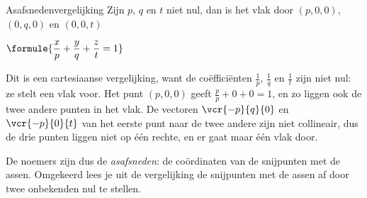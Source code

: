 \begin{theorie}
\begin{stelling}{Asafsnedenvergelijking}
Zijn $p$, $q$ en $t$ niet nul, dan is het vlak door $(p, 0, 0)$, $(0, q, 0)$ en $(0, 0, t)$

\vspace{1mm}
\qquad $\formule{\dfrac{x}{p} + \dfrac{y}{q} + \dfrac{z}{t} = 1}$
\end{stelling}
\begin{bewijs}
Dit is een cartesiaanse vergelijking, want de coëfficiënten $\frac1p$, $\frac1q$ en $\frac1t$ zijn niet nul: ze stelt een vlak voor. Het punt $(p, 0, 0)$ geeft $\frac{p}{p} + 0 + 0 = 1$, en zo liggen ook de twee andere punten in het vlak. De vectoren $\vcr{-p}{q}{0}$ en $\vcr{-p}{0}{t}$ van het eerste punt naar de twee andere zijn niet collineair, dus de drie punten liggen niet op één rechte, en er gaat maar één vlak door.
\end{bewijs}
\end{theorie}

De noemers zijn dus de \textit{asafsneden}: de coördinaten van de snijpunten met de assen. Omgekeerd lees je uit de vergelijking de snijpunten met de assen af door twee onbekenden nul te stellen.


\begin{oefeningen}

\end{oefeningen}

